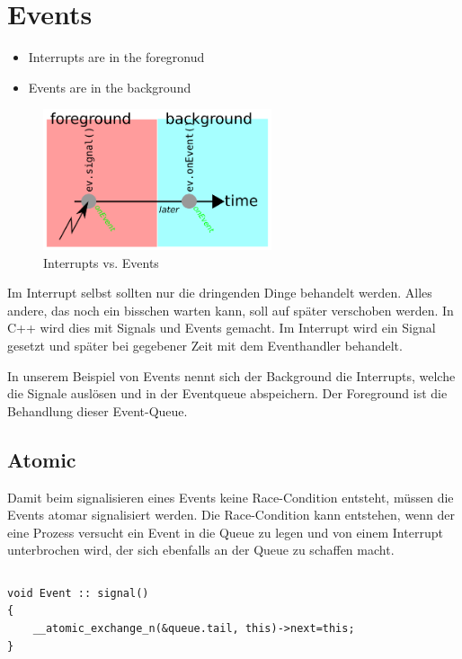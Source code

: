 \hypertarget{events}{%
\section{Events}\label{events}}

\begin{itemize}
    \item Interrupts are in the foregronud
    \item Events are in the background
\end{itemize}

\begin{figure}[H]
\centering
\includegraphics[width=0.6\textwidth]{figures/interruptsVsEvents.png}
\caption{Interrupts vs. Events}
\end{figure}

Im Interrupt selbst
sollten nur die dringenden Dinge behandelt werden. Alles andere, das
noch ein bisschen warten kann, soll auf später verschoben werden. In C++
wird dies mit Signals und Events gemacht. Im Interrupt wird ein Signal
gesetzt und später bei gegebener Zeit mit dem Eventhandler behandelt.

In unserem Beispiel von Events nennt sich der Background die Interrupts,
welche die Signale auslösen und in der Eventqueue abspeichern. Der
Foreground ist die Behandlung dieser Event-Queue.

\hypertarget{atomic}{%
\subsection{Atomic}\label{atomic}}

Damit beim signalisieren eines Events keine Race-Condition entsteht,
müssen die Events atomar signalisiert werden. Die Race-Condition kann
entstehen, wenn der eine Prozess versucht ein Event in die Queue zu
legen und von einem Interrupt unterbrochen wird, der sich ebenfalls an
der Queue zu schaffen macht.

\begin{verbatim}

\end{verbatim}

\begin{lstlisting}
void Event :: signal()
{
    __atomic_exchange_n(&queue.tail, this)->next=this;
}
\end{lstlisting}

\clearpage